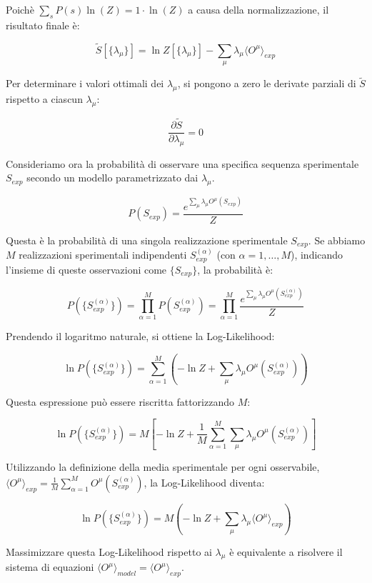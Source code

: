 Poichè $\sum_s P(s) \ln(Z) = 1 \cdot \ln(Z)$ a causa della normalizzazione, il risultato finale è:

\begin{equation} \label{eq:ch24_15}
\tilde{S}[\{\lambda_\mu\}] = \ln Z[\{\lambda_\mu\}] - \sum_\mu \lambda_\mu \langle O^\mu \rangle_{exp}
\end{equation}

Per determinare i valori ottimali dei $\lambda_\mu$, si pongono a zero le derivate parziali di $\tilde{S}$ rispetto a ciascun $\lambda_\mu$:

\begin{equation} \label{eq:ch24_16}
\frac{\partial\tilde{S}}{\partial\lambda_\mu} = 0
\end{equation}

Consideriamo ora la probabilità di osservare una specifica sequenza sperimentale $S_{exp}$ secondo un modello parametrizzato dai $\lambda_\mu$.

\begin{equation} \label{eq:ch24_17}
P(S_{exp}) = \frac{e^{\sum_\mu \lambda_\mu O^\mu(S_{exp})}}{Z}
\end{equation}

Questa è la probabilità di una singola realizzazione sperimentale $S_{exp}$. Se abbiamo $M$ realizzazioni sperimentali indipendenti $S_{exp}^{(\alpha)}$ (con $\alpha = 1, \dots, M$), indicando l'insieme di queste osservazioni come $\{S_{exp}\}$, la probabilità è:

\begin{equation} \label{eq:ch24_18}
P(\{S_{exp}^{(\alpha)}\}) = \prod_{\alpha=1}^{M} P(S_{exp}^{(\alpha)}) = \prod_{\alpha=1}^{M} \frac{e^{\sum_\mu \lambda_\mu O^\mu(S_{exp}^{(\alpha)})}}{Z}
\end{equation}

Prendendo il logaritmo naturale, si ottiene la Log-Likelihood:

\begin{equation} \label{eq:ch24_19}
\ln P(\{S_{exp}^{(\alpha)}\}) = \sum_{\alpha=1}^{M} \left( -\ln Z + \sum_\mu \lambda_\mu O^\mu(S_{exp}^{(\alpha)}) \right)
\end{equation}

Questa espressione può essere riscritta fattorizzando $M$:

\begin{equation} \label{eq:ch24_20}
\ln P(\{S_{exp}^{(\alpha)}\}) = M \left[ -\ln Z + \frac{1}{M} \sum_{\alpha=1}^{M} \sum_\mu \lambda_\mu O^\mu(S_{exp}^{(\alpha)}) \right]
\end{equation}

Utilizzando la definizione della media sperimentale per ogni osservabile, $\langle O^\mu \rangle_{exp} = \frac{1}{M} \sum_{\alpha=1}^{M} O^\mu(S_{exp}^{(\alpha)})$, la Log-Likelihood diventa:

\begin{equation} \label{eq:ch24_21}
\ln P(\{S_{exp}^{(\alpha)}\}) = M \left( -\ln Z + \sum_\mu \lambda_\mu \langle O^\mu \rangle_{exp} \right)
\end{equation}

Massimizzare questa Log-Likelihood rispetto ai $\lambda_\mu$ è equivalente a risolvere il sistema di equazioni $\langle O^\mu \rangle_{model} = \langle O^\mu \rangle_{exp}$.
